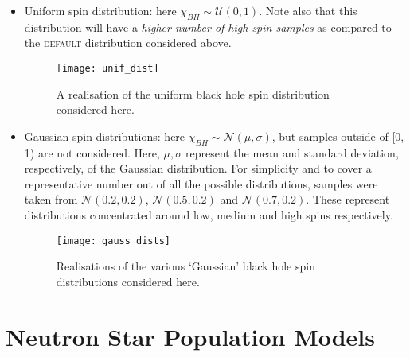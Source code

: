         \begin{itemize}

            \item Uniform spin distribution: here $\chi_{BH} \sim \mathcal{U}(0, 1)$.
                Note also that this distribution will have a \emph{higher number of high
                spin samples} as compared to the \textsc{default} distribution
                considered above.

                \begin{figure}[H]
                    \centering
                    \texttt{[image: unif\_dist]}
                    \caption[Uniform Black Hole Spin Distribution]{
                        A realisation of the uniform black hole spin distribution
                        considered here.
                    }
                    \label{fig:unif_dist}
                \end{figure}

            \item Gaussian spin distributions: here $\chi_{BH} \sim \mathcal{N}(\mu,
                \sigma)$, but samples outside of [0, 1) are not considered. Here, $\mu,
                \sigma$ represent the mean and standard deviation, respectively, of the
                Gaussian distribution. For simplicity and to cover a representative
                number out of all the possible distributions, samples were taken from
                $\mathcal{N}(0.2, 0.2)$, $\mathcal{N}(0.5, 0.2)$ and $\mathcal{N}(0.7,
                0.2)$. These represent distributions concentrated around low, medium and
                high spins respectively.

                \begin{figure}[H]
                    \centering
                    \texttt{[image: gauss\_dists]}
                    \caption[Gaussian Black Hole Spin Distributions]{
                        Realisations of the various `Gaussian' black hole spin
                        distributions considered here.
                    }
                    \label{fig:gauss_dists}
                \end{figure}

        \end{itemize}


\section{Neutron Star Population Models}\label{sec:ns_pop}

